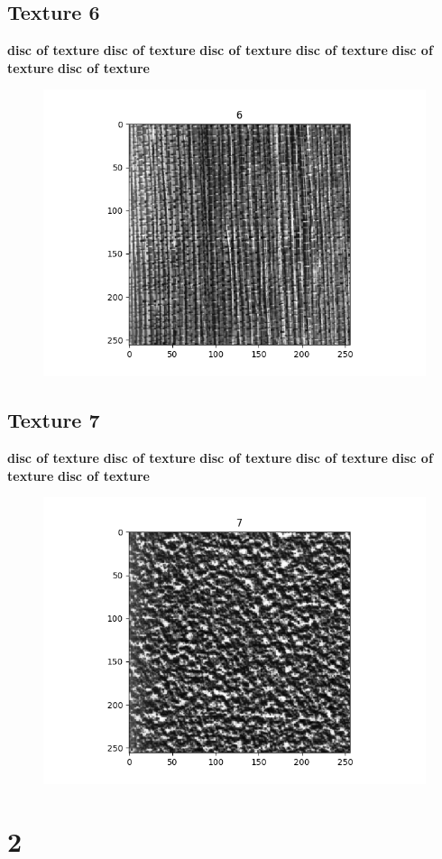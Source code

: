\documentclass{article}
\begin{document}
\subsection{Texture 6}
\textbf{disc of texture}
\textbf{disc of texture}
\textbf{disc of texture}
\textbf{disc of texture}
\textbf{disc of texture}
\textbf{disc of texture}
\begin{figure}[h!]
\includegraphics[scale=0.5]{6.png}
\end{figure}

\newpage

\subsection{Texture 7}
\textbf{disc of texture}
\textbf{disc of texture}
\textbf{disc of texture}
\textbf{disc of texture}
\textbf{disc of texture}
\textbf{disc of texture}
\begin{figure}[h!]
\includegraphics[scale=0.5]{7.png}
\end{figure}

\section{2}
\end{document}
